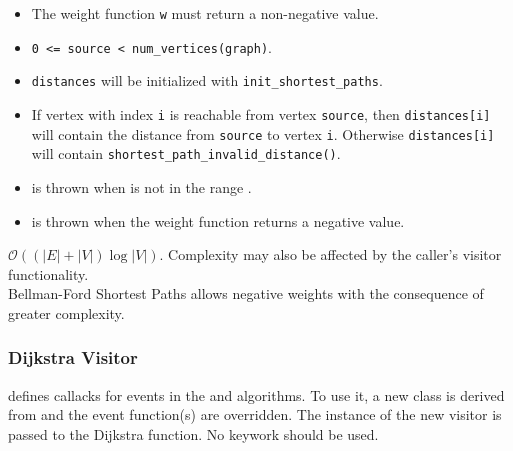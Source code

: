 \begin{itemdescr}
      \pnum\mandates
            \begin{itemize}
                  \item
                        The weight function \lstinline{w} must return a non-negative value.
            \end{itemize}
      \pnum\preconditions
            \begin{itemize}
                  \item
                        \lstinline{0 <= source < num_vertices(graph)}. 
                  \item
                        \lstinline{distances} will be initialized with \lstinline{init_shortest_paths}.
            \end{itemize}
      \pnum\effects
            \begin{itemize}
                  \item
                        If vertex with index \lstinline{i} is reachable from vertex \lstinline{source}, then
                        \lstinline{distances[i]} will contain the distance from \lstinline{source} to vertex
                        \lstinline{i}.  Otherwise \lstinline{distances[i]} will contain
                        \lstinline{shortest_path_invalid_distance()}.
            \end{itemize}
      \pnum\throws 
            \begin{itemize}
                  \item {} is thrown when  is not in the range .
                  \item {} is thrown when the weight function returns a negative value.
            \end{itemize}
      \pnum\complexity
                        $\mathcal{O}((|E| + |V|)\log{|V|})$. 
                        Complexity may also be affected by the caller's visitor functionality. \\
      \pnum\remarks 
                        Bellman-Ford Shortest Paths allows negative weights with the consequence of greater complexity. \\
\end{itemdescr}

\subsubsection{Dijkstra Visitor}
 defines callacks for events in the 
and  algorithms. To use it, a new class is derived from 
 and the event function(s) are overridden. The instance of the
new visitor is passed to the Dijkstra function. No  keywork should be used.

